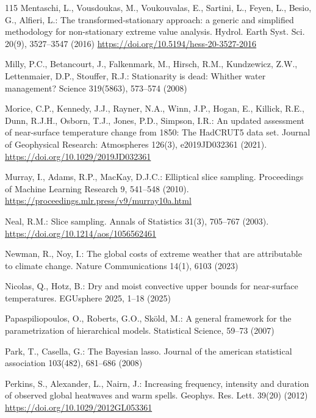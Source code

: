 \documentclass[11pt,a4paper]{article}
\begin{document}
\begin{thebibliography}{115}
		Mentaschi, L., Vousdoukas, M., Voukouvalas, E., Sartini, L., Feyen, L., Besio, G., Alfieri, L.: The transformed-stationary approach: a generic and simplified methodology for non-stationary extreme value analysis. Hydrol. Earth Syst. Sci. 20(9), 3527--3547 (2016) \url{https://doi.org/10.5194/hess-20-3527-2016}
		
		Milly, P.C., Betancourt, J., Falkenmark, M., Hirsch, R.M., Kundzewicz, Z.W., Lettenmaier, D.P., Stouffer, R.J.: Stationarity is dead: Whither water management? Science 319(5863), 573--574 (2008)
		
		Morice, C.P., Kennedy, J.J., Rayner, N.A., Winn, J.P., Hogan, E., Killick, R.E., Dunn, R.J.H., Osborn, T.J., Jones, P.D., Simpson, I.R.: An updated assessment of near-surface temperature change from 1850: The HadCRUT5 data set. Journal of Geophysical Research: Atmospheres 126(3), e2019JD032361 (2021). \url{https://doi.org/10.1029/2019JD032361}
		
		Murray, I., Adams, R.P., MacKay, D.J.C.: Elliptical slice sampling. Proceedings of Machine Learning Research 9, 541--548 (2010). \url{https://proceedings.mlr.press/v9/murray10a.html}
		
		Neal, R.M.: Slice sampling. Annals of Statistics 31(3), 705--767 (2003). \url{https://doi.org/10.1214/aos/1056562461}
		
		Newman, R., Noy, I.: The global costs of extreme weather that are attributable to climate change. Nature Communications 14(1), 6103 (2023)
		
		Nicolas, Q., Hotz, B.: Dry and moist convective upper bounds for near-surface temperatures. EGUsphere 2025, 1--18 (2025)
		
		Papaspiliopoulos, O., Roberts, G.O., Sköld, M.: A general framework for the parametrization of hierarchical models. Statistical Science, 59--73 (2007)
		
		Park, T., Casella, G.: The Bayesian lasso. Journal of the american statistical association 103(482), 681--686 (2008)
		
		Perkins, S., Alexander, L., Nairn, J.: Increasing frequency, intensity and duration of observed global heatwaves and warm spells. Geophys. Res. Lett. 39(20) (2012) \url{https://doi.org/10.1029/2012GL053361}
		

\end{thebibliography}
\end{document}
